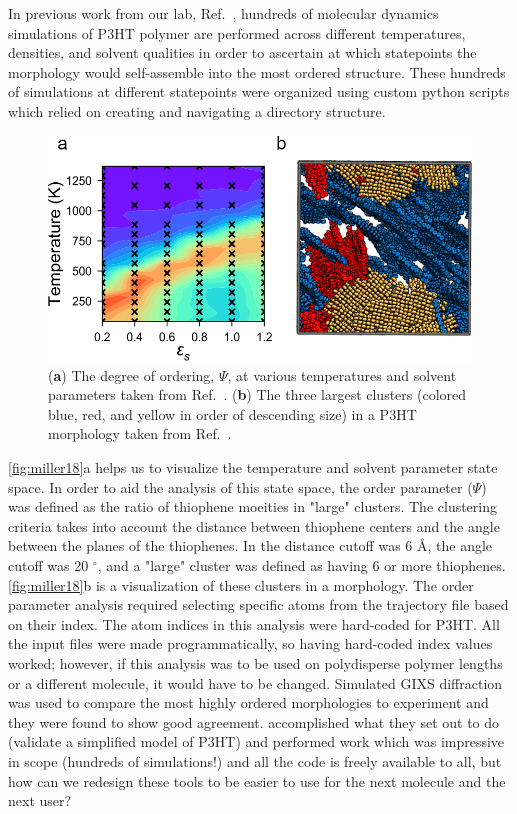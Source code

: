In previous work from our lab, Ref.~\citet{Miller2018}, hundreds of molecular dynamics simulations of P3HT polymer are performed across different temperatures, densities, and solvent qualities in order to ascertain at which statepoints the morphology would self-assemble into the most ordered structure.
These hundreds of simulations at different statepoints were organized using custom python scripts which relied on creating and navigating a directory structure.
\begin{figure}[h!]
    \centering
    \includegraphics[width=0.8\linewidth]{figures/p3ht_val/miller2018_figs.png}
    \caption{(\textbf{a}) The degree of ordering, $\Psi$, at various temperatures and solvent parameters taken from Ref.~\citet{Miller2018}. (\textbf{b}) The three largest clusters (colored blue, red, and yellow in order of descending size) in a P3HT morphology taken from Ref.~\citet{Miller2018}.}\label{fig:miller18}
\end{figure}
\autoref{fig:miller18}a helps us to visualize the temperature and solvent parameter state space.
In order to aid the analysis of this state space, the order parameter ($\Psi$) was defined as the ratio of thiophene moeities in "large" clusters.
The clustering criteria takes into account the distance between thiophene centers and the angle between the planes of the thiophenes.
In \citet{Miller2018} the distance cutoff was 6 \AA, the angle cutoff was 20 $^{\circ}$, and a "large" cluster was defined as having 6 or more thiophenes.
\autoref{fig:miller18}b is a visualization of these clusters in a morphology.
The order parameter analysis required selecting specific atoms from the trajectory file based on their index.
The atom indices in this analysis were hard-coded for P3HT.
All the input files were made programmatically, so having hard-coded index values worked; however, if this analysis was to be used on polydisperse polymer lengths or a different molecule, it would have to be changed.
Simulated GIXS diffraction was used to compare the most highly ordered morphologies to experiment and they were found to show good agreement.
\citet{Miller2018} accomplished what they set out to do (validate a simplified model of P3HT) and performed work which was impressive in scope (hundreds of simulations!) and all the code is freely available to all, but how can we redesign these tools to be easier to use for the next molecule and the next user?

